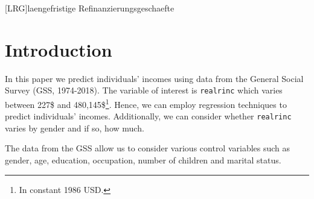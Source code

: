 \documentclass[11pt,a4paper]{article}
\let\rmarkdownfootnote\footnote%
\def\footnote{\protect\rmarkdownfootnote}
\begin{document}
\newpage
\listoffigures
{}




\begin{adjustwidth}{1.5em}{0pt}

\begin{acronym}[dummyyyy]
 [LRG]{laengefristige Refinanzierungsgeschaefte}

\end{acronym}

\end{adjustwidth}

\restoregeometry

\newpage
{}
\hypertarget{introduction}{%
\section{Introduction}\label{introduction}}

In this paper we predict individuals' incomes using data from the
General Social Survey (GSS, 1974-2018). The variable of interest is
\texttt{realrinc} which varies between 227\$ and
480,145\$\footnote{In constant 1986 USD.}. Hence, we can employ
regression techniques to predict individuals' incomes. Additionally, we
can consider whether \texttt{realrinc} varies by gender and if so, how
much.

The data from the GSS allow us to consider various control variables
such as gender, age, education, occupation, number of children and
marital status.
\end{document}
